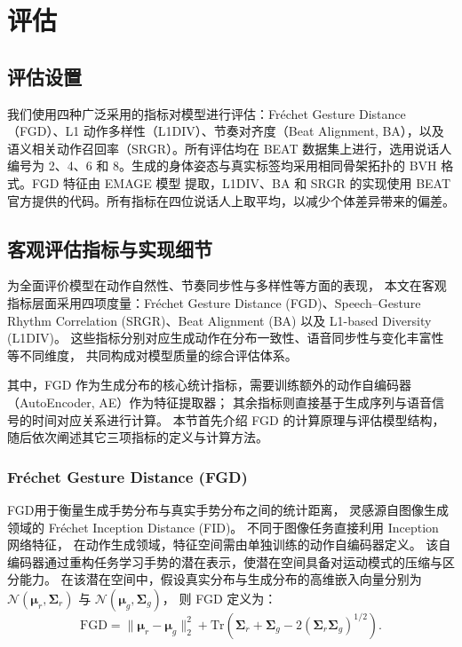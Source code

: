 
\chapter{评估}

\section{评估设置}

我们使用四种广泛采用的指标对模型进行评估：Fréchet Gesture Distance（FGD）\cite{speech_gesture_generation}、L1 动作多样性（L1DIV）\cite{beatcamn}、节奏对齐度（Beat Alignment, BA）\cite{beatcamn}，以及语义相关动作召回率（SRGR）\cite{beatcamn}。所有评估均在 BEAT 数据集上进行，选用说话人编号为 2、4、6 和 8。生成的身体姿态与真实标签均采用相同骨架拓扑的 BVH 格式。FGD 特征由 EMAGE 模型 \cite{emage} 提取，L1DIV、BA 和 SRGR 的实现使用 BEAT 官方提供的代码。所有指标在四位说话人上取平均，以减少个体差异带来的偏差。

\section{客观评估指标与实现细节}
\label{sec:objective_metrics}

为全面评价模型在动作自然性、节奏同步性与多样性等方面的表现，
本文在客观指标层面采用四项度量：Fréchet Gesture Distance (FGD)、Speech–Gesture Rhythm Correlation (SRGR)、Beat Alignment (BA) 以及 L1-based Diversity (L1DIV)。
这些指标分别对应生成动作在分布一致性、语音同步性与变化丰富性等不同维度，
共同构成对模型质量的综合评估体系。

其中，FGD 作为生成分布的核心统计指标，需要训练额外的动作自编码器（AutoEncoder, AE）作为特征提取器；
其余指标则直接基于生成序列与语音信号的时间对应关系进行计算。
本节首先介绍 FGD 的计算原理与评估模型结构，
随后依次阐述其它三项指标的定义与计算方法。

\subsection{Fréchet Gesture Distance (FGD)}
\label{subsec:fgd}

FGD\cite{speech_gesture_generation}用于衡量生成手势分布与真实手势分布之间的统计距离，
灵感源自图像生成领域的 Fréchet Inception Distance (FID)。
不同于图像任务直接利用 Inception 网络特征，
在动作生成领域，特征空间需由单独训练的动作自编码器定义。
该自编码器通过重构任务学习手势的潜在表示，使潜在空间具备对运动模式的压缩与区分能力。
在该潜在空间中，假设真实分布与生成分布的高维嵌入向量分别为
$\mathcal{N}(\bm{\mu}_r, \bm{\Sigma}_r)$ 与 $\mathcal{N}(\bm{\mu}_g, \bm{\Sigma}_g)$，
则 FGD 定义为：
\begin{equation}
\mathrm{FGD} = 
\|\bm{\mu}_r - \bm{\mu}_g\|_2^2 +
\mathrm{Tr}(\bm{\Sigma}_r + \bm{\Sigma}_g - 2(\bm{\Sigma}_r \bm{\Sigma}_g)^{1/2}).
\end{equation}

